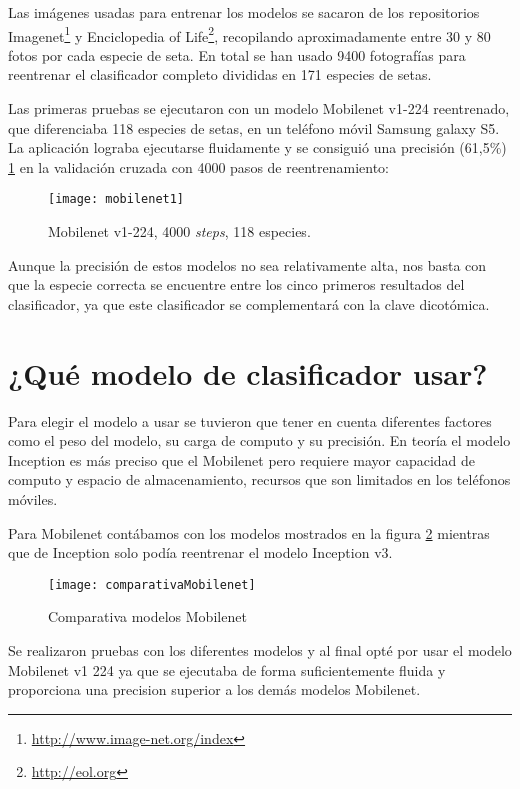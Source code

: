 Las imágenes usadas para entrenar los modelos se sacaron de los repositorios Imagenet\footnote{\url{http://www.image-net.org/index}} y Enciclopedia of Life\footnote{\url{http://eol.org}}, recopilando aproximadamente entre 30 y 80 fotos por cada especie de seta. En total se han usado 9400 fotografías para reentrenar el clasificador completo divididas en 171 especies de setas.

Las primeras pruebas se ejecutaron con un modelo Mobilenet v1-224 reentrenado, que diferenciaba 118 especies de setas, en un teléfono móvil Samsung galaxy S5. La aplicación lograba ejecutarse fluidamente y se consiguió una precisión (61,5\%) \ref{figMobilenet1} en la validación cruzada con 4000 pasos de reentrenamiento:

\begin{figure}[h]
    \begin{center}%
        \begin{center}%
          \texttt{[image: mobilenet1]}%
          \caption{Mobilenet v1-224, 4000 \textit{steps}, 118 especies.}%
          \label{figMobilenet1}%
        \end{center}%
  	\end{center}%
\end{figure}%

Aunque la precisión de estos modelos no sea relativamente alta, nos basta con que la especie correcta se encuentre entre los cinco primeros resultados del clasificador, ya que este clasificador se complementará con la clave dicotómica.

\section{¿Qué modelo de clasificador usar?}

Para elegir el modelo a usar se tuvieron que tener en cuenta diferentes factores como el peso del modelo, su carga de computo y su precisión. En teoría el modelo Inception es más preciso que el Mobilenet pero requiere mayor capacidad de computo y espacio de almacenamiento, recursos que son limitados en los teléfonos móviles.

Para Mobilenet contábamos con los modelos mostrados en la figura \ref{figComparativaMobilenet} mientras que de Inception solo podía reentrenar el modelo Inception v3.

\begin{figure}[h]
    \begin{center}%
        \begin{center}%
          \texttt{[image: comparativaMobilenet]}%
          \caption{Comparativa modelos Mobilenet}%
          \label{figComparativaMobilenet}%
        \end{center}%
  	\end{center}%
\end{figure}%
\newpage
Se realizaron pruebas con los diferentes modelos y al final opté por usar el modelo Mobilenet v1 224 ya que se ejecutaba de forma suficientemente fluida y proporciona una precision superior a los demás modelos Mobilenet. 

